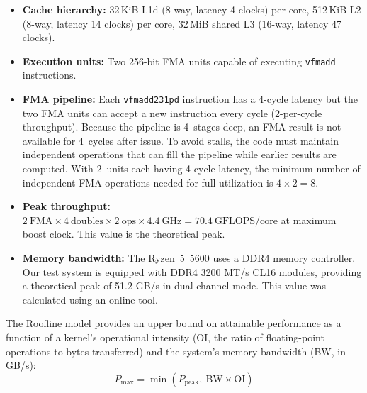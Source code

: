 \documentclass[conference]{IEEEtran}
\begin{document}
\begin{itemize}
\item \textbf{Cache hierarchy:} 32\,KiB L1d (8-way, latency 4 clocks) per core,
      512\,KiB L2 (8-way, latency 14 clocks) per core, 32\,MiB shared L3 (16-way,
      latency 47 clocks).
\item \textbf{Execution units:} Two 256-bit FMA units capable of
      executing \texttt{vfmadd} instructions.
\item \textbf{FMA pipeline:} Each \texttt{vfmadd231pd} instruction has a
      4-cycle latency but the two FMA units can accept a new instruction every
      cycle (2-per-cycle throughput). Because the pipeline is
      4~stages deep, an FMA result is not available for 4~cycles after issue.
      To avoid stalls, the code must maintain independent operations that can
      fill the pipeline while earlier results are computed. With 2~units each
      having 4-cycle latency, the minimum number of independent FMA operations
      needed for full utilization is $4 \times 2 = 8$.
\item \textbf{Peak throughput:}
      $2\ \text{FMA} \times 4\ \text{doubles} \times 2\ \text{ops} \times
      4.4\ \text{GHz} = 70.4\ \text{GFLOPS/core}$ at maximum boost clock.
      This value is the theoretical peak.
\item \textbf{Memory bandwidth:} The Ryzen~5~5600 uses a DDR4 memory controller.
      Our test system is equipped with DDR4 3200 MT/s CL16 modules,
      providing a theoretical peak of 51.2 GB/s in dual-channel mode.
      This value was calculated using an online tool.\cite{ramcalc}
\end{itemize}

The Roofline model\cite{roofline} provides an upper bound on attainable
performance as a function of a kernel's operational intensity (OI, the ratio of
floating-point operations to bytes transferred) and the system's memory bandwidth
(BW, in GB/s):
\begin{equation}
P_{\max} = \min(P_{\text{peak}},\ \text{BW} \times \text{OI})
\label{eq:roofline}
\end{equation}
\end{document}
